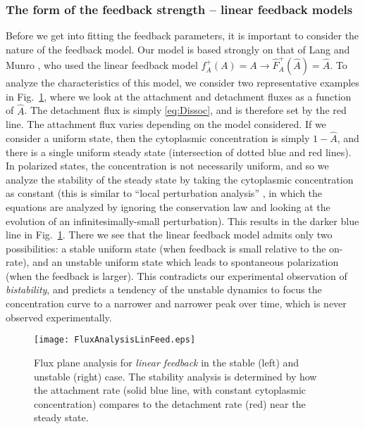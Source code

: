\documentclass[11pt]{article}
\newcommand{\6}[1]{#1_{\text{6}}}
\newcommand{\3}[1]{#1_{\text{3}}}
\begin{document}
\subsubsection{The form of the feedback strength -- linear feedback models}
Before we get into fitting the feedback parameters, it is important to consider the nature of the feedback model. Our model is based strongly on that of Lang and Munro \cite{lang2022oligomerization}, who used the linear feedback model $f_A^+(A)=A \rightarrow \hat F_A^+(\hat A)=\hat A.$
To analyze the characteristics of this model, we consider two representative examples in Fig.\ \ref{fig:P3Linear}, where we look at the attachment and detachment fluxes as a function of $\hat A$. The detachment flux is simply \eqref{eq:Dissoc}, and is therefore set by the red line. The attachment flux varies depending on the model considered. If we consider a uniform state, then the cytoplasmic concentration is simply $1-\hat A$, and there is a single uniform steady state (intersection of dotted blue and red lines). In polarized states, the concentration is not necessarily uniform, and so we analyze the stability of the steady state by taking the cytoplasmic concentration as constant (this is similar to ``local perturbation analysis'' \cite{holmes2015local}, in which the equations are analyzed by ignoring the conservation law and looking at the evolution of an infinitesimally-small perturbation). This results in the darker blue line in Fig.\ \ref{fig:P3Linear}. There we see that the linear feedback model admits only two possibilities: a stable uniform state (when feedback is small relative to the on-rate), and an unstable uniform state which leads to spontaneous polarization (when the feedback is larger). This contradicts our experimental observation of \emph{bistability}, and predicts a tendency of the unstable dynamics to focus the concentration curve to a narrower and narrower peak over time, which is never observed experimentally.

\begin{figure}
\centering
\texttt{[image: FluxAnalysisLinFeed.eps]}
\caption{\label{fig:P3Linear}Flux plane analysis for \emph{linear feedback} in the stable (left) and unstable (right) case. The stability analysis is determined by how the attachment rate (solid blue line, with constant cytoplasmic concentration) compares to the detachment rate (red) near the steady state.}
\end{figure}
\end{document}
